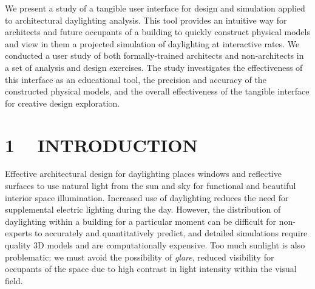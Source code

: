 \documentclass{article}
\begin{document}
\abstract
%
We present a study of a tangible user interface for design and
simulation applied to architectural daylighting analysis.  This tool
provides an intuitive way for architects and future occupants of a
building to quickly construct physical models and view in them a
projected simulation of daylighting at interactive rates.  We
conducted a user study of both formally-trained architects and
non-architects in a set of analysis and design exercises.  The study
investigates the effectiveness of this interface as an educational
tool, the precision and accuracy of the constructed physical models,
and the overall effectiveness of the tangible interface for creative
design exploration.  
%
%





\section{1 ~ INTRODUCTION}
Effective architectural design for daylighting places windows and
reflective surfaces to use natural light from the sun and sky for
functional and beautiful interior space illumination.  Increased use
of daylighting reduces the need for supplemental electric lighting
during the day.  However, the distribution of daylighting within a
building for a particular moment can be difficult for non-experts to
accurately and quantitatively predict, and detailed simulations
require quality 3D models and are computationally expensive.  
Too
much sunlight is also problematic: we must avoid the possibility of
{\em glare}, reduced visibility for occupants of the space due to high
contrast in light intensity within the visual field.
%
\end{document}
